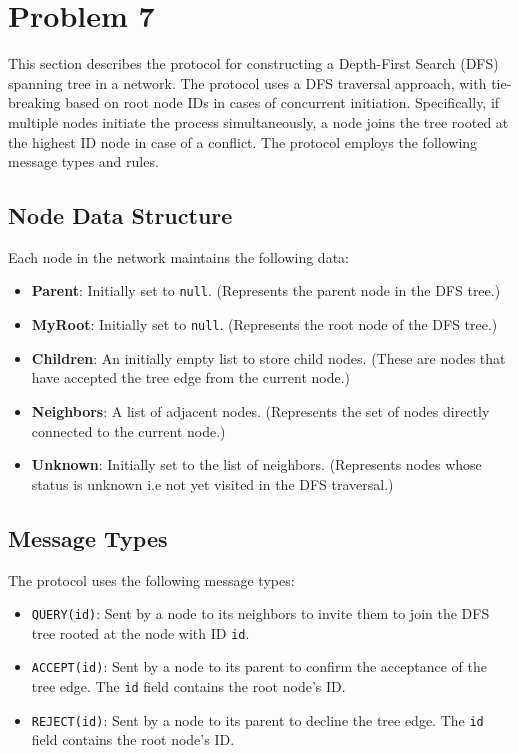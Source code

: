 \section{Problem 7}\label{prob7}

This section describes the protocol for constructing a Depth-First Search (DFS) spanning tree in a network. The protocol uses a DFS traversal approach, with tie-breaking based on root node IDs in cases of concurrent initiation. Specifically, if multiple nodes initiate the process simultaneously, a node joins the tree rooted at the highest ID node in case of a conflict. The protocol employs the following message types and rules.

\subsection{Node Data Structure}
Each node in the network maintains the following data:
\begin{itemize}
    \item \textbf{Parent}: Initially set to \texttt{null}. (Represents the parent node in the DFS tree.)
    \item \textbf{MyRoot}: Initially set to \texttt{null}. (Represents the root node of the DFS tree.)
    \item \textbf{Children}: An initially empty list to store child nodes. (These are nodes that have accepted the tree edge from the current node.)
    \item \textbf{Neighbors}: A list of adjacent nodes. (Represents the set of nodes directly connected to the current node.)
    \item \textbf{Unknown}: Initially set to the list of neighbors. (Represents nodes whose status is unknown i.e not yet visited in the DFS traversal.)
\end{itemize}

\subsection{Message Types}
The protocol uses the following message types:
\begin{itemize}
    \item \texttt{QUERY(id)}: Sent by a node to its neighbors to invite them to join the DFS tree rooted at the node with ID \texttt{id}.
    \item \texttt{ACCEPT(id)}: Sent by a node to its parent to confirm the acceptance of the tree edge. The \texttt{id} field contains the root node's ID.
    \item \texttt{REJECT(id)}: Sent by a node to its parent to decline the tree edge. The \texttt{id} field contains the root node's ID.
\end{itemize}

